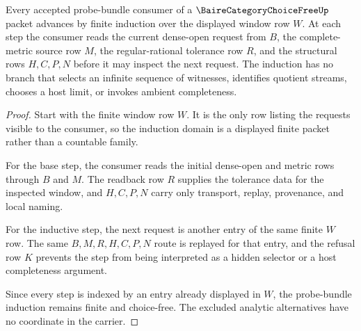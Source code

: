 \begin{theorem}
\label{thm:baire-category-choice-free-probebundle-induction}
Every accepted probe-bundle consumer of a $\BaireCategoryChoiceFreeUp$ packet advances by finite induction over the displayed window row $W$. At each step the consumer reads the current dense-open request from $B$, the complete-metric source row $M$, the regular-rational tolerance row $R$, and the structural rows $H,C,P,N$ before it may inspect the next request. The induction has no branch that selects an infinite sequence of witnesses, identifies quotient streams, chooses a host limit, or invokes ambient completeness.
\end{theorem}
\begin{proof}
Start with the finite window row $W$. It is the only row listing the requests visible to the consumer, so the induction domain is a displayed finite packet rather than a countable family.

For the base step, the consumer reads the initial dense-open and metric rows through $B$ and $M$. The readback row $R$ supplies the tolerance data for the inspected window, and $H,C,P,N$ carry only transport, replay, provenance, and local naming.

For the inductive step, the next request is another entry of the same finite $W$ row. The same $B,M,R,H,C,P,N$ route is replayed for that entry, and the refusal row $K$ prevents the step from being interpreted as a hidden selector or a host completeness argument.

Since every step is indexed by an entry already displayed in $W$, the probe-bundle induction remains finite and choice-free. The excluded analytic alternatives have no coordinate in the carrier.
\end{proof}

